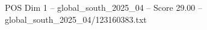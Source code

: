\begin{textsample}{POS Dim 1 – global\_south\_2025\_04 – Score 29.00 – global\_south\_2025\_04/123160383.txt}
\end{textsample}
